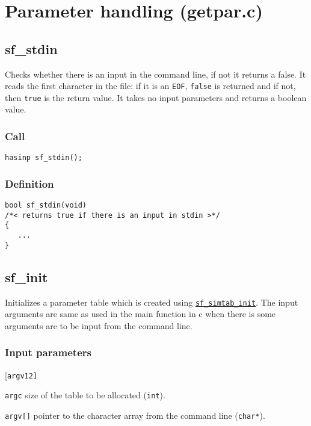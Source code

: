 \section{Parameter handling (getpar.c)}




\subsection{{sf\_stdin}}
Checks whether there is an input in the command line, if not it returns a false. It reads the first character in the file: if it is an \texttt{EOF}, \texttt{false} is returned and if not, then \texttt{true} is the return value. It takes no input parameters and returns a boolean value.

\subsubsection*{Call}
\begin{verbatim}hasinp sf_stdin();\end{verbatim}

\subsubsection*{Definition}
\begin{verbatim}
bool sf_stdin(void)
/*< returns true if there is an input in stdin >*/
{
   ...
}
\end{verbatim}




\subsection{{sf\_init}}\label{sec:sf_init}
Initializes a parameter table which is created using \hyperref[sec:sf_simtab_init]{\texttt{sf\_simtab\_init}}.
The input arguments are same as used in the main function in c when there is some arguments are to be input from the command line.

\subsubsection*{Input parameters}
\begin{desclist}{}{\quad}[\tt argv12]
   \setlength\itemsep{0pt}
   \item[\texttt{argc}] size of the table to be allocated (\texttt{int}). 
   \item[\texttt{argv[]}] pointer to the character array from the command line (\texttt{char*}).
\end{desclist}

